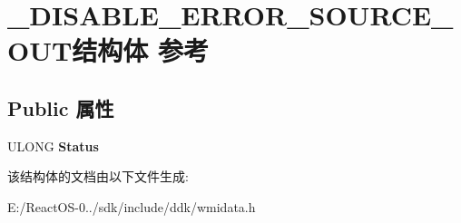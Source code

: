 \hypertarget{struct___d_i_s_a_b_l_e___e_r_r_o_r___s_o_u_r_c_e___o_u_t}{}\section{\+\_\+\+D\+I\+S\+A\+B\+L\+E\+\_\+\+E\+R\+R\+O\+R\+\_\+\+S\+O\+U\+R\+C\+E\+\_\+\+O\+U\+T结构体 参考}
\label{struct___d_i_s_a_b_l_e___e_r_r_o_r___s_o_u_r_c_e___o_u_t}
\subsection*{Public 属性}
\begin{DoxyCompactItemize}
\item 
\mbox{\label{struct___d_i_s_a_b_l_e___e_r_r_o_r___s_o_u_r_c_e___o_u_t_a7160990b1f8ad9aa17aa2dc304a33b56}} 
U\+L\+O\+NG {\bfseries Status}
\end{DoxyCompactItemize}


该结构体的文档由以下文件生成\+:\begin{DoxyCompactItemize}
\item 
E\+:/\+React\+O\+S-\/0../sdk/include/ddk/wmidata.\+h\end{DoxyCompactItemize}
